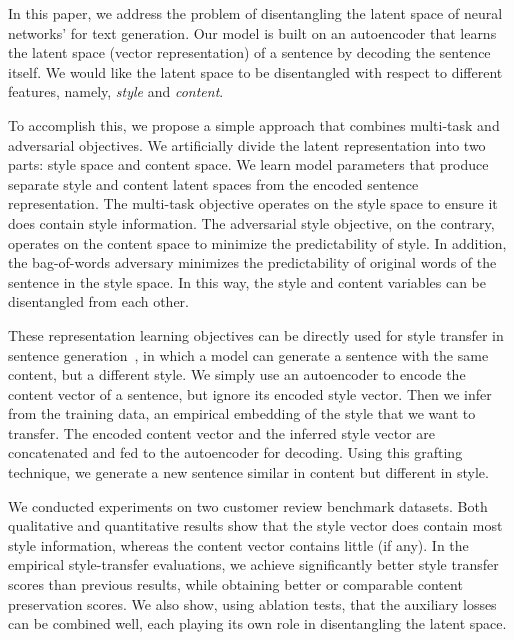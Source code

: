 \documentclass[11pt,a4paper]{article}
\begin{document}
In this paper, we address the problem of disentangling the latent space of neural networks' for text generation. Our model is built on an autoencoder that learns the latent space (vector representation) of a sentence by decoding the sentence itself. We would like the latent space to be disentangled with respect to different features, namely, \textit{style} and \textit{content}.

To accomplish this, we propose a simple approach that combines multi-task and adversarial objectives. We artificially divide the latent representation into two parts: style space and content space. We learn model parameters that produce separate style and content latent spaces from the encoded sentence representation. The multi-task objective operates on the style space to ensure it does contain style information. The adversarial style objective, on the contrary, operates on the content space to minimize the predictability of style. In addition, the bag-of-words adversary minimizes the predictability of original words of the sentence in the style space. In this way, the style and content variables can be disentangled from each other.

These representation learning objectives can be directly used for style transfer in sentence generation~\cite{hu2017toward,shen2017style,fu2017style}, in which a model can generate a sentence with the same content, but a different style. We simply use an autoencoder to encode the content vector of a sentence, but ignore its encoded style vector. Then we infer from the training data, an empirical embedding of the style that we want to transfer. The encoded content vector and the inferred style vector are concatenated and fed to the autoencoder for decoding. Using this grafting technique, we generate a new sentence similar in content but different in style.

We conducted experiments on two customer review benchmark datasets. Both qualitative and quantitative results show that the style vector does contain most style information, whereas the content vector contains little (if any). In the empirical style-transfer evaluations, we achieve significantly better style transfer scores than previous results, while obtaining better or comparable content preservation scores. We also show, using ablation tests, that the auxiliary losses can be combined well, each playing its own role in disentangling the latent space.
\end{document}
